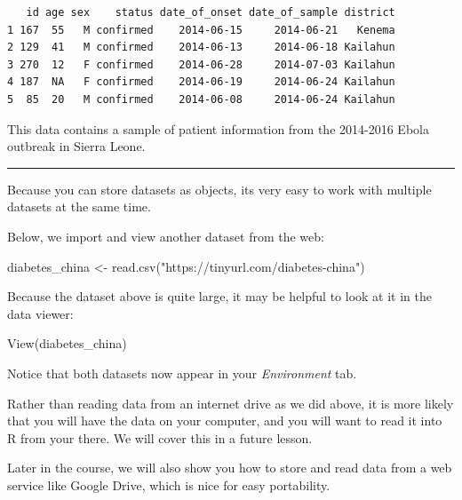 \documentclass[
  letterpaper,
  DIV=11,
  numbers=noendperiod]{scrreprt}
\newenvironment{Shaded}{\begin{snugshade}}{\end{snugshade}}
\newcommand{\FunctionTok}[1]{\textcolor[rgb]{0.28,0.35,0.67}{#1}}
\newcommand{\NormalTok}[1]{\textcolor[rgb]{0.00,0.23,0.31}{#1}}
\newcommand{\OtherTok}[1]{\textcolor[rgb]{0.00,0.23,0.31}{#1}}
\newcommand{\StringTok}[1]{\textcolor[rgb]{0.13,0.47,0.30}{#1}}
\begin{document}
\begin{verbatim}
   id age sex    status date_of_onset date_of_sample district
1 167  55   M confirmed    2014-06-15     2014-06-21   Kenema
2 129  41   M confirmed    2014-06-13     2014-06-18 Kailahun
3 270  12   F confirmed    2014-06-28     2014-07-03 Kailahun
4 187  NA   F confirmed    2014-06-19     2014-06-24 Kailahun
5  85  20   M confirmed    2014-06-08     2014-06-24 Kailahun
\end{verbatim}

This data contains a sample of patient information from the 2014-2016
Ebola outbreak in Sierra Leone.

\begin{center}\rule{0.5\linewidth}{0.5pt}\end{center}

Because you can store datasets as objects, its very easy to work with
multiple datasets at the same time.

Below, we import and view another dataset from the web:

\begin{Shaded}
\begin{Highlighting}[]
\NormalTok{diabetes\_china }\OtherTok{\textless{}{-}} \FunctionTok{read.csv}\NormalTok{(}\StringTok{"https://tinyurl.com/diabetes{-}china"}\NormalTok{)}
\end{Highlighting}
\end{Shaded}

Because the dataset above is quite large, it may be helpful to look at
it in the data viewer:

\begin{Shaded}
\begin{Highlighting}[]
\FunctionTok{View}\NormalTok{(diabetes\_china)}
\end{Highlighting}
\end{Shaded}

Notice that both datasets now appear in your \emph{Environment} tab.

\begin{tcolorbox}[enhanced jigsaw, title=\textcolor{quarto-callout-note-color}{\faInfo}\hspace{0.5em}{Side Note}, colbacktitle=quarto-callout-note-color!10!white, leftrule=.75mm, arc=.35mm, opacityback=0, bottomrule=.15mm, rightrule=.15mm, toptitle=1mm, breakable, toprule=.15mm, colback=white, coltitle=black, colframe=quarto-callout-note-color-frame, bottomtitle=1mm, titlerule=0mm, left=2mm, opacitybacktitle=0.6]

Rather than reading data from an internet drive as we did above, it is
more likely that you will have the data on your computer, and you will
want to read it into R from your there. We will cover this in a future
lesson.

Later in the course, we will also show you how to store and read data
from a web service like Google Drive, which is nice for easy
portability.

\end{tcolorbox}
\end{document}
